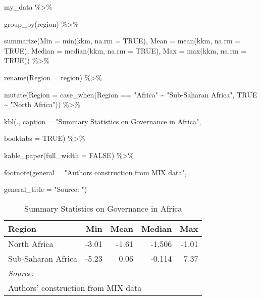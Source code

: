 \documentclass[a4paper,nobind]{templates/ociamthesis}
\newenvironment{Shaded}{\begin{snugshade}}{\end{snugshade}}
\newcommand{\AttributeTok}[1]{\textcolor[rgb]{0.77,0.63,0.00}{#1}}
\newcommand{\ConstantTok}[1]{\textcolor[rgb]{0.00,0.00,0.00}{#1}}
\newcommand{\FunctionTok}[1]{\textcolor[rgb]{0.00,0.00,0.00}{#1}}
\newcommand{\NormalTok}[1]{#1}
\newcommand{\SpecialCharTok}[1]{\textcolor[rgb]{0.00,0.00,0.00}{#1}}
\newcommand{\StringTok}[1]{\textcolor[rgb]{0.31,0.60,0.02}{#1}}
\renewenvironment{Shaded}
{
  \vspace{10pt}%
  \begin{snugshade}%
}{%
  \end{snugshade}%
  \vspace{8pt}%
}
\begin{document}
\begin{Shaded}
\begin{Highlighting}[]
\NormalTok{my\_data }\SpecialCharTok{\%\textgreater{}\%} 
  
  \FunctionTok{group\_by}\NormalTok{(region) }\SpecialCharTok{\%\textgreater{}\%} 
  
  \FunctionTok{summarize}\NormalTok{(}\AttributeTok{Min =} \FunctionTok{min}\NormalTok{(kkm, }\AttributeTok{na.rm =} \ConstantTok{TRUE}\NormalTok{),}
            \AttributeTok{Mean =} \FunctionTok{mean}\NormalTok{(kkm, }\AttributeTok{na.rm =} \ConstantTok{TRUE}\NormalTok{),}
            \AttributeTok{Median =} \FunctionTok{median}\NormalTok{(kkm, }\AttributeTok{na.rm =} \ConstantTok{TRUE}\NormalTok{),}
            \AttributeTok{Max =} \FunctionTok{max}\NormalTok{(kkm, }\AttributeTok{na.rm =} \ConstantTok{TRUE}\NormalTok{)) }\SpecialCharTok{\%\textgreater{}\%} 
  
  \FunctionTok{rename}\NormalTok{(}\AttributeTok{Region =}\NormalTok{ region) }\SpecialCharTok{\%\textgreater{}\%} 
  
  \FunctionTok{mutate}\NormalTok{(}\AttributeTok{Region =} \FunctionTok{case\_when}\NormalTok{(Region }\SpecialCharTok{==} \StringTok{"Africa"} \SpecialCharTok{\textasciitilde{}} \StringTok{"Sub{-}Saharan Africa"}\NormalTok{,}
                            \ConstantTok{TRUE} \SpecialCharTok{\textasciitilde{}} \StringTok{"North Africa"}\NormalTok{)) }\SpecialCharTok{\%\textgreater{}\%} 
  
  \FunctionTok{kbl}\NormalTok{(., }\AttributeTok{caption =} \StringTok{"Summary Statistics on Governance in Africa"}\NormalTok{, }
      
      \AttributeTok{booktabs =} \ConstantTok{TRUE}\NormalTok{) }\SpecialCharTok{\%\textgreater{}\%} 
  
  \FunctionTok{kable\_paper}\NormalTok{(}\AttributeTok{full\_width =} \ConstantTok{FALSE}\NormalTok{) }\SpecialCharTok{\%\textgreater{}\%} 
  
  \FunctionTok{footnote}\NormalTok{(}\AttributeTok{general =} \StringTok{"Authors\textquotesingle{} construction from MIX data"}\NormalTok{,}
           
           \AttributeTok{general\_title =} \StringTok{"Source: "}\NormalTok{)}
\end{Highlighting}
\end{Shaded}

\begin{table}

\caption{\label{tab:unnamed-chunk-22}Summary Statistics on Governance in Africa}
\centering
\begin{tabular}[t]{lrrrr}
\toprule
Region & Min & Mean & Median & Max\\
\midrule
North Africa & -3.01 & -1.61 & -1.506 & -1.01\\
Sub-Saharan Africa & -5.23 & 0.06 & -0.114 & 7.37\\
\bottomrule
\multicolumn{5}{l}{\rule{0pt}{1em}\textit{Source: }}\\
\multicolumn{5}{l}{\rule{0pt}{1em}Authors' construction from MIX data}\\
\end{tabular}
\end{table}
\end{document}
